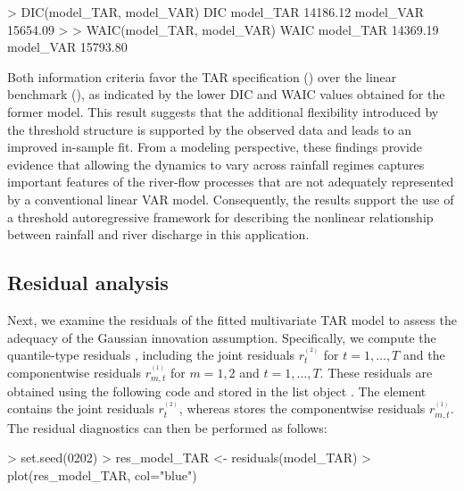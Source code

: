 \begin{example}
> DIC(model_TAR, model_VAR)
                DIC
model_TAR  14186.12
model_VAR  15654.09
>
> WAIC(model_TAR, model_VAR)
               WAIC
model_TAR  14369.19
model_VAR  15793.80
\end{example}

Both information criteria favor the TAR specification () over the linear benchmark (), as indicated by the lower DIC and WAIC values obtained for the former model. This result suggests that the additional flexibility introduced by the threshold structure is supported by the observed data and leads to an improved in-sample fit. From a modeling perspective, these findings provide evidence that allowing the dynamics to vary across rainfall regimes captures important features of the river-flow processes that are not adequately represented by a conventional linear VAR model. Consequently, the results support the use of a threshold autoregressive framework for describing the nonlinear relationship between rainfall and river discharge in this application.

\subsection{Residual analysis}
Next, we examine the residuals of the fitted multivariate TAR model to assess the adequacy of the Gaussian innovation assumption. Specifically, we compute the quantile-type residuals \citep{dunn1996randomized}, including the joint residuals $r_t^{^{\!(2)}}$ for $t=1,\ldots,T$ and the componentwise residuals $r_{m,t}^{^{\!(1)}}$ for $m=1,2$ and $t=1,\ldots,T$. These residuals are obtained using the following code and stored in the list object . The element  contains the joint residuals $r_t^{^{\!(2)}}$, whereas  stores the componentwise residuals $r_{m,t}^{^{\!(1)}}$. The residual diagnostics can then be performed as follows:

\begin{example}
> set.seed(0202)
> res_model_TAR <- residuals(model_TAR)
> plot(res_model_TAR, col="blue")
\end{example}

